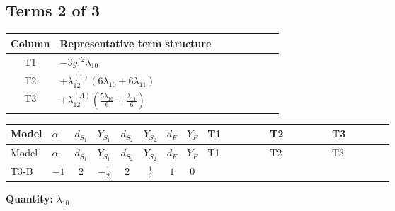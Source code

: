 \documentclass[8pt]{article}
\begin{document}
\begin{landscape}
\subsection*{Terms 2 of 3}
\begin{center}
\begin{tabular}{@{}c >{\raggedright\arraybackslash}p{0.82\linewidth}@{}}
\toprule
Column & Representative term structure \\
\midrule
T1 & \(\displaystyle -3 {g_1}^2 {\lambda_{10}}\) \\
\midrule
T2 & \(\displaystyle +{\lambda_{12}^{(1)}} (6 {\lambda_{10}}+6 {\lambda_{11}})\) \\
\midrule
T3 & \(\displaystyle +{\lambda_{12}^{(A)}} \left(\frac{5 {\lambda_{10}}}{6}+\frac{{\lambda_{11}}}{6}\right)\) \\
\midrule
\bottomrule
\end{tabular}
\end{center}
\smallskip
\tiny
\begin{longtable}{@{}llcccccc >{\raggedright\arraybackslash}p{0.21\linewidth} >{\raggedright\arraybackslash}p{0.21\linewidth} >{\raggedright\arraybackslash}p{0.21\linewidth}@{}}
\toprule
Model & $\alpha$ & $d_{S_1}$ & $Y_{S_1}$ & $d_{S_2}$ & $Y_{S_2}$ & $d_F$ & $Y_F$ & T1 & T2 & T3 \\
\midrule
\endfirsthead
\toprule
Model & $\alpha$ & $d_{S_1}$ & $Y_{S_1}$ & $d_{S_2}$ & $Y_{S_2}$ & $d_F$ & $Y_F$ & T1 & T2 & T3 \\
\midrule
\endhead
T3-B & $-1$ & $2$ & $-\frac{1}{2}$ & $2$ & $\frac{1}{2}$ & $1$ & $0$ & \scriptsize\adjustbox{max width=\linewidth}{$\begin{gathered} -3 {g_1}^2 {\lambda_{10}}\end{gathered}$} & \scriptsize\adjustbox{max width=\linewidth}{$\begin{gathered} +{\lambda_{12}^{(1)}} (6 {\lambda_{10}}+6 {\lambda_{11}})\end{gathered}$} & \scriptsize\adjustbox{max width=\linewidth}{$\begin{gathered} +{\lambda_{12}^{(A)}} \left(\frac{5 {\lambda_{10}}}{6}+\frac{{\lambda_{11}}}{6}\right)\end{gathered}$} \\
\midrule
\bottomrule
\end{longtable}
\clearpage
\noindent\textbf{Quantity: }$\lambda_{10}$\par\smallskip

\end{landscape}
\end{document}
